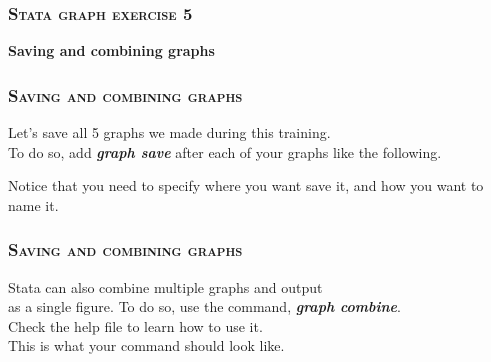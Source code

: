 \documentclass[10pt]{beamer}
\begin{document}
	\begin{frame}
	\frametitle{\textsc{Stata graph exercise 5}}
		\begin{center}
		\Large \textbf{Saving and combining graphs}
		\end{center}
	\end{frame}	
	
	\begin{frame}
	\frametitle{\textsc{Saving and combining graphs}}
		 Let's save all 5 graphs we made during this training. \\
		\vspace{1mm}
		\onslide<2-> To do so, add \textbf{\textit{graph save}} 
					 after each of your graphs like the following.
	
\begin{stlog}\end{stlog}
		\vspace{1mm}
		Notice that you need to specify where you want save it, 
		and how you want to name it.
	\end{frame}
	
	\begin{frame}
	\frametitle{\textsc{Saving and combining graphs}}
		 Stata can also combine multiple graphs and output \\
					 as a single figure.
			\vspace{1mm}
		\onslide<2-> To do so, use the command,  \textbf{\textit{graph combine}}. \\
					 Check the help file to learn how to use it. \\
			\vspace{1mm}					
		\onslide<3-> This is what your command should look like.
	
\begin{stlog}\end{stlog}
	\end{frame}
				
\end{document}
